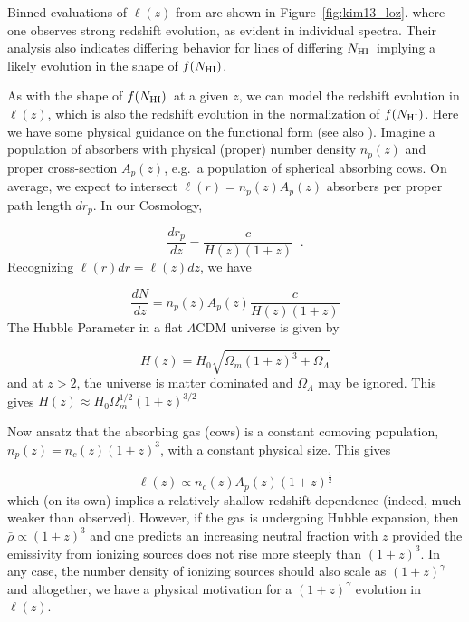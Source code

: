 \documentclass[graybox]{svmult}
\def\ohf{\frac{1}{2}}
\newcommand{\mnhi}{N_{\rm HI}}
\newcommand{\nhi}{$\mnhi$}
\def\mfnhi{f(\mnhi)}
\def\fnhi{$\mfnhi$}
\begin{document}
Binned evaluations of $\ell(z)$ from \cite{kim13}
are shown in Figure~\ref{fig:kim13_loz}.
where one observes strong redshift evolution, 
as evident in individual spectra.
Their analysis also indicates differing behavior
for lines of differing \nhi\ implying a likely
evolution in the shape of \fnhi.

As with the shape of \fnhi\ at a given $z$,
we can model the redshift evolution in $\ell(z)$,
which is also the redshift evolution in the
normalization of \fnhi.  Here we have some
physical guidance on the functional form
(see also \cite{meiksin09}).
Imagine a population of absorbers with physical (proper)
number density $n_p(z)$ and proper cross-section $A_p(z)$,
e.g.\ a population of spherical absorbing cows.
On average, we expect to intersect
$\ell(r) = n_p(z) A_p(z)$ absorbers per proper path length $d r_p$.
In our Cosmology,

\begin{equation}
\frac{dr_p}{dz} = \frac{c}{H(z) (1+z)} \;\; .
\label{eqn:drdz}
\end{equation}
Recognizing $\ell(r) dr = \ell(z) dz$, we have

\begin{equation}
\frac{dN}{dz} = n_p(z) A_p(z) \frac{c}{H(z) (1+z)}
\end{equation}
The Hubble Parameter in a flat $\Lambda$CDM universe
is given by

\begin{equation}
H(z) = H_0 \sqrt{\Omega_m (1+z)^3 + \Omega_\Lambda}
\end{equation}
and at $z>2$, the universe is matter dominated and 
$\Omega_\Lambda$ may be ignored.  This gives
$H(z) \approx H_0 \Omega_m^{1/2} (1+z)^{3/2}$

Now ansatz that the absorbing gas (cows) is
a constant comoving population, 
$n_p(z) = n_c(z) (1+z)^{3}$, with a constant
physical size.  This gives

\begin{equation}
\ell(z) \propto n_c(z) A_p(z) (1+z)^{\ohf}
\end{equation}
which (on its own) implies a relatively shallow
redshift dependence (indeed, much weaker than observed).
However, if the gas is undergoing Hubble expansion, then 
$\bar\rho \propto (1+z)^3$ and one predicts
an increasing neutral fraction with $z$ 
provided the emissivity from ionizing sources does
not rise more steeply than $(1+z)^3$.
In any case, the number density of ionizing sources
should also scale as $(1+z)^\gamma$
and altogether, we have a physical motivation for a $(1+z)^\gamma$
evolution in $\ell(z)$.
\end{document}
